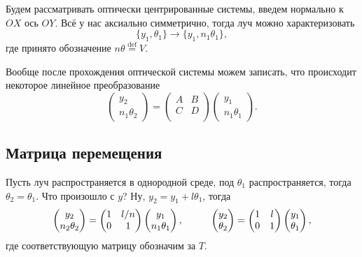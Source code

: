 Будем рассматривать оптически центрированные системы, введем нормально к $OX$ ось $OY$. Всё у нас аксиально симметрично, тогда луч можно характеризовать
\begin{equation*}
    \{y_1, \theta_1\} \to 
    \{y_1, n_1 \theta_1\},
\end{equation*}
где принято обозначение $n \theta \overset{\mathrm{def}}{=} V$.

Вообще после прохождения оптической системы можем записать, что происходит некоторое линейное преобразование
\begin{equation*}
    \begin{pmatrix}
        y_2 \\ n_1 \theta_2
    \end{pmatrix} = 
    \begin{pmatrix}
        A & B \\
        C & D \\
    \end{pmatrix}
    \begin{pmatrix}
        y_1 \\ n_1 \theta_1
    \end{pmatrix}.
\end{equation*}


\subsection{Матрица перемещения}

Пусть луч распространяется в однородной среде, под $\theta_1$ распространяется, тогда $\theta_2 = \theta_1$. Что произошло с $y$? Ну, $y_2 = y_1 + l \theta_1$, тогда
\begin{equation}
    \begin{pmatrix}
        y_2 \\ n_2 \theta_2
    \end{pmatrix} = 
    \begin{pmatrix}
        1 & l/n \\
        0 & 1 \\
    \end{pmatrix} 
    \begin{pmatrix}
        y_1 \\ n_1 \theta_1 
    \end{pmatrix},
    \hspace{1 cm}
    \begin{pmatrix}
        y_2 \\ \theta_2
    \end{pmatrix} = 
    \begin{pmatrix}
        1 & l \\
        0 & 1 \\
    \end{pmatrix} 
    \begin{pmatrix}
        y_1 \\ \theta_1 
    \end{pmatrix}, 
\end{equation}
где соответствующую матрицу обозначим за $T$. 


